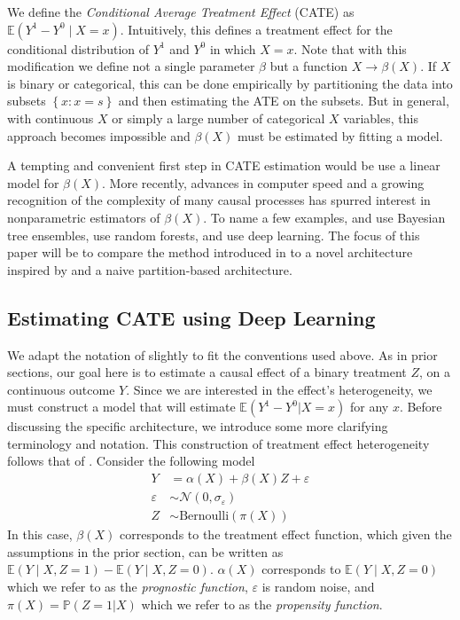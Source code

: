 \documentclass[11pt,  dvipsnames, table, x11name]{article}
\newcommand\E[1]{\mathbb{E}\left(#1\right)}
\newcommand\Pro[1]{\mathbb{P}\left(#1\right)}
\begin{document}
	We define the \textit{Conditional Average Treatment Effect} (CATE) as $\E{Y^1 - Y^0 \mid X = x}$. 
	Intuitively, this defines a treatment effect for the conditional distribution of $Y^1$ and $Y^0$ in which $X = x$. 
	Note that with this modification we define not a single parameter $\beta$ but a function $X \longrightarrow \beta(X)$. 
	If $X$ is binary or categorical, this can be done empirically by partitioning the data into subsets 
	$\left\{x: x = s\right\}$ and then estimating the ATE on the subsets. But in general, with continuous $X$ 
	or simply a large number of categorical $X$ variables, this approach becomes impossible and $\beta(X)$ 
	must be estimated by fitting a model.
	
	A tempting and convenient first step in CATE estimation would be use a linear model for $\beta(X)$. 
	More recently, advances in computer speed and a growing recognition of the complexity of many 
	causal processes has spurred interest in nonparametric estimators of $\beta(X)$. 
	To name a few examples, \cite{hahn2020bayesian} and \cite{hill2011bayesian} use Bayesian tree ensembles, 
	\cite{wager2018estimation} use random forests, and \cite{farrell2020deep} use deep learning. 
	The focus of this paper will be to compare the method introduced in \cite{farrell2020deep} to a novel architecture 
	inspired by \cite{hahn2020bayesian} and a naive partition-based architecture.
	\subsection{Estimating CATE using Deep Learning}
	We adapt the notation of \cite{farrell2020deep} slightly to fit the conventions used above. 
	As in prior sections, our goal here is to estimate a causal effect of a binary treatment $Z$, on 
	a continuous outcome $Y$. Since we are interested in the effect's heterogeneity, we must 
	construct a model that will estimate $\E{Y^1 - Y^0 | X = x}$ for any $x$. Before discussing the 
	specific architecture, we introduce some more clarifying terminology and notation. This construction of 
	treatment effect heterogeneity follows that of \cite{hahn2020bayesian}. Consider the following model
	\begin{align*}
		Y &= \alpha\left(X\right) + \beta\left(X\right) Z + \varepsilon\\
		\varepsilon &\sim \mathcal{N}\left(0, \sigma_{\varepsilon} \right)\\
		Z &\sim \textrm{Bernoulli}\left(\pi(X)\right)
	\end{align*}
	In this case, $\beta\left(X\right)$ corresponds to the treatment effect function, which given the 
	assumptions in the prior section, can be written as $\E{Y \mid X, Z = 1} - \E{Y \mid X, Z = 0}$.
	$\alpha(X)$ corresponds to $\E{Y \mid X, Z = 0}$ which we refer to as the \textit{prognostic function}, 
	$\varepsilon$ is random noise, and $\pi(X) = \Pro{Z = 1 | X}$ which we refer to as the 
	\textit{propensity function}.
	
\end{document}
